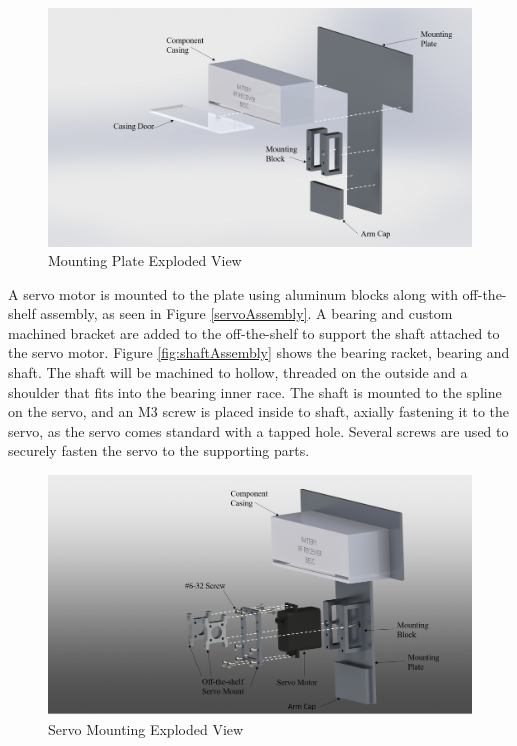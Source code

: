 \documentclass[../main.tex]{subfiles}
\begin{document}
\begin{figure}[H]
	\centering
	\includegraphics[width=.8\linewidth]{img/design/thruster/plateAssembly.png}
	\caption{Mounting Plate Exploded View}
	\label{fig:plateAssembly}
\end{figure}

 A servo motor is mounted to the plate using aluminum blocks along with off-the-shelf assembly, as seen in Figure \ref{servoAssembly}. A bearing and custom machined bracket are added to the off-the-shelf to support the shaft attached to the servo motor. Figure \ref{fig:shaftAssembly} shows the bearing racket, bearing and shaft. The shaft will be machined to hollow, threaded on the outside and a shoulder that fits into the bearing inner race. The shaft is mounted to the spline on the servo, and an M3 screw is placed inside to shaft, axially fastening it to the servo, as the servo comes standard with a tapped hole. Several screws are used to securely fasten the servo to the supporting parts.
 \\
 
 \begin{figure}[H]
 	\centering
 	\includegraphics[width=.8\linewidth]{img/design/thruster/servoAssembly.png}
 	\caption{Servo Mounting Exploded View}
 	\label{fig:servoAssembly}
 \end{figure}
 
\end{document}
